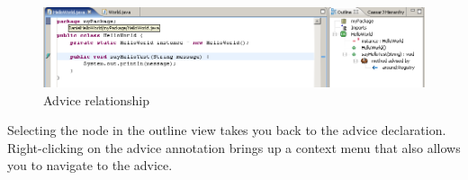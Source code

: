\begin{figure}[htbp]
	\centering
		\includegraphics[width=1.0\textwidth]{images/aspect3.png}
	\caption{Advice relationship}
	\label{fig:aspect3}
\end{figure}

Selecting the  node in the outline view takes you back to the advice declaration. Right-clicking on the advice annotation brings up a context menu that also allows you to navigate to the advice.

